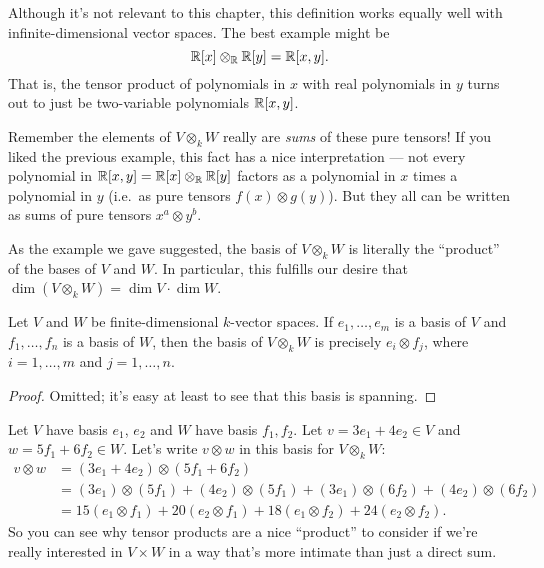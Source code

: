 \begin{example}
	Although it's not relevant to this chapter,
	this definition works equally well with infinite-dimensional
	vector spaces.
	The best example might be
	\[ \mathbb R[x] \otimes_\mathbb R \mathbb R[y] = \mathbb R[x,y]. \]
	That is, the tensor product of polynomials in $x$
	with real polynomials in $y$
	turns out to just be two-variable polynomials $\mathbb R[x,y]$.
\end{example}

\begin{remark}
	Remember the elements of $V \otimes_k W$
	really are \emph{sums} of these pure tensors!
	If you liked the previous example,
	this fact has a nice interpretation ---
	not every polynomial in $\mathbb R[x,y] = \mathbb R[x] \otimes_\mathbb R \mathbb R[y]$ factors
	as a polynomial in $x$ times a polynomial in $y$
	(i.e.\ as pure tensors $f(x) \otimes g(y)$).
	But they all can be written as sums of pure tensors $x^a \otimes y^b$.
\end{remark}


As the example we gave suggested,
the basis of $V \otimes_k W$ is literally the ``product''
of the bases of $V$ and $W$.
In particular, this fulfills our desire that
$\dim (V \otimes_k W) = \dim V \cdot \dim W$.
\begin{proposition}
	Let $V$ and $W$ be finite-dimensional $k$-vector spaces.
	If $e_1, \dots, e_m$ is a basis of $V$ and $f_1, \dots, f_n$ is a basis of $W$,
	then the basis of $V \otimes_k W$
	is precisely $e_i \otimes f_j$, where $i=1,\dots,m$ and $j=1,\dots,n$.
\end{proposition}
\begin{proof}
	Omitted; it's easy at least to see that this basis is spanning.
\end{proof}

\begin{example}
	Let $V$ have basis $e_1$, $e_2$ and $W$ have basis $f_1, f_2$.
	Let $v = 3e_1 + 4e_2 \in V$ and $w = 5f_1 + 6f_2 \in W$.
	Let's write $v \otimes w$ in this basis for $V \otimes_k W$:
	\begin{align*}
		v \otimes w &= (3e_1+4e_2) \otimes (5f_1+6f_2) \\
		&= (3e_1) \otimes (5f_1) +  (4e_2) \otimes (5f_1)
		+ (3e_1) \otimes (6f_2) + (4e_2) \otimes (6f_2) \\
		&= 15 (e_1 \otimes f_1) + 20(e_2 \otimes f_1)
		+ 18 (e_1 \otimes f_2) + 24(e_2 \otimes f_2).
	\end{align*}
	So you can see why tensor products are a nice ``product'' to
	consider if we're really interested in $V \times W$
	in a way that's more intimate than just a direct sum.
\end{example}

